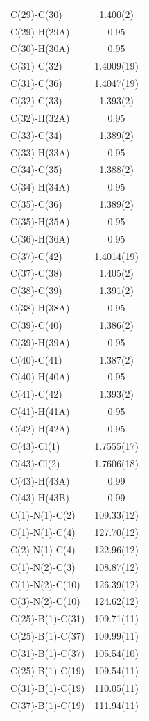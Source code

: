 \begin{center}
{\begin{supertabular}{p{1.5in}c}
C(29)-C(30) &1.400(2)\\
C(29)-H(29A) &0.95\\
C(30)-H(30A) &0.95\\
C(31)-C(32) &1.4009(19)\\
C(31)-C(36) &1.4047(19)\\
C(32)-C(33) &1.393(2)\\
C(32)-H(32A) &0.95\\
C(33)-C(34) &1.389(2)\\
C(33)-H(33A) &0.95\\
C(34)-C(35) &1.388(2)\\
C(34)-H(34A) &0.95\\
C(35)-C(36) &1.389(2)\\
C(35)-H(35A) &0.95\\
C(36)-H(36A) &0.95\\
C(37)-C(42) &1.4014(19)\\
C(37)-C(38) &1.405(2)\\
C(38)-C(39) &1.391(2)\\
C(38)-H(38A) &0.95\\
C(39)-C(40) &1.386(2)\\
C(39)-H(39A) &0.95\\
C(40)-C(41) &1.387(2)\\
C(40)-H(40A) &0.95\\
C(41)-C(42) &1.393(2)\\
C(41)-H(41A) &0.95\\
C(42)-H(42A) &0.95\\
C(43)-Cl(1) &1.7555(17)\\
C(43)-Cl(2) &1.7606(18)\\
C(43)-H(43A) &0.99\\
C(43)-H(43B) &0.99\\
C(1)-N(1)-C(2)&109.33(12)\\
C(1)-N(1)-C(4)&127.70(12)\\
C(2)-N(1)-C(4)&122.96(12)\\
C(1)-N(2)-C(3)&108.87(12)\\
C(1)-N(2)-C(10)&126.39(12)\\
C(3)-N(2)-C(10)&124.62(12)\\
C(25)-B(1)-C(31)&109.71(11)\\
C(25)-B(1)-C(37)&109.99(11)\\
C(31)-B(1)-C(37)&105.54(10)\\
C(25)-B(1)-C(19)&109.54(11)\\
C(31)-B(1)-C(19)&110.05(11)\\
C(37)-B(1)-C(19)&111.94(11)\\

\end{supertabular}}
\end{center}
